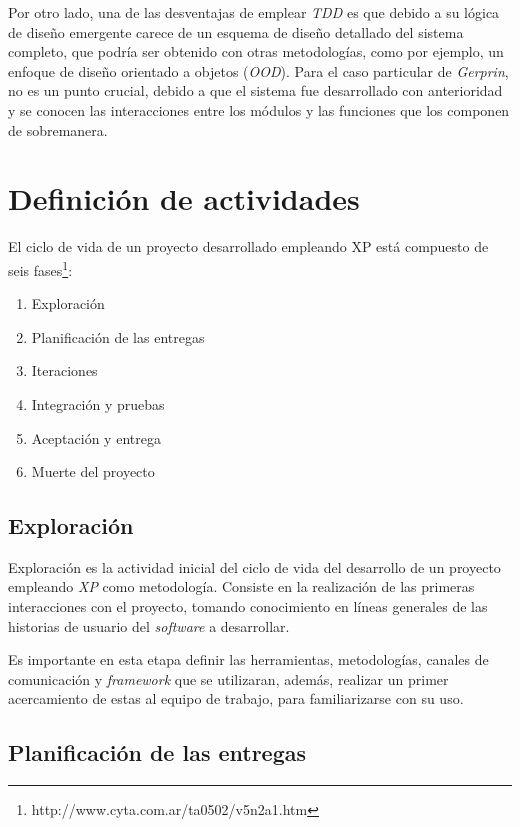 Por otro lado, una de las desventajas de emplear \textit{TDD} es que debido a su lógica de diseño emergente carece de un esquema de diseño detallado del sistema completo, que podría ser obtenido con otras metodologías, como por ejemplo, un enfoque de diseño orientado a objetos (\textit{OOD}).  Para el caso particular de \textit{Gerprin}, no es un punto crucial, debido a que el sistema fue desarrollado con anterioridad y se conocen las interacciones entre los módulos y las funciones que los componen de sobremanera.

\section{Definición de actividades}

El ciclo de vida de un proyecto desarrollado empleando XP está compuesto de seis fases\footnote{http://www.cyta.com.ar/ta0502/v5n2a1.htm}:  

\begin{enumerate}
	\item Exploración
	\item Planificación de las entregas
	\item Iteraciones
	\item Integración y pruebas
	\item Aceptación y entrega
	\item Muerte del proyecto
\end{enumerate}

\subsection{Exploración}

Exploración es la actividad inicial del ciclo de vida del desarrollo de un proyecto empleando \textit{XP} como metodología. Consiste en la realización de las primeras interacciones con el proyecto, tomando conocimiento en líneas generales de las historias de usuario del \textit{software} a desarrollar. 

Es importante en esta etapa definir las herramientas, metodologías, canales de comunicación y \textit{framework} que se utilizaran, además, realizar un primer acercamiento de estas al equipo de trabajo, para familiarizarse con su uso.

\subsection{Planificación de las entregas}

